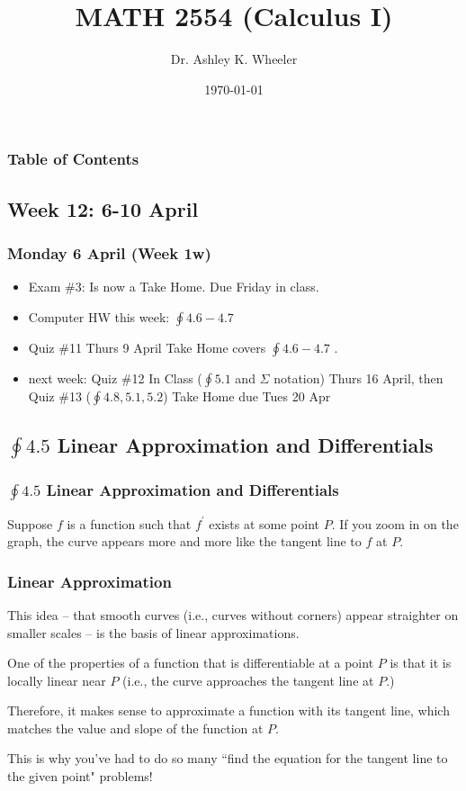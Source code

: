 \documentclass[14pt]{beamer}
\title[Cal I S2015]{MATH 2554 (Calculus I)}
\subtitle{}
\author[Wheeler]{Dr. Ashley K. Wheeler}
\institute{University of Arkansas}
\date{\today}
\begin{document}
\maketitle

\begin{frame}
\frametitle{Table of Contents}
\tableofcontents
\end{frame}


\begin{frame}
\section[Week 12]{Week 12: 6-10 April}
\frametitle{Monday 6 April (Week 1w)}
\small
\begin{itemize}
\item Exam \#3: Is now a Take Home.  Due Friday in class.
\item Computer HW this week: $\oint 4.6-4.7$ 	
\item Quiz \#11 Thurs 9 April Take Home covers $\oint 4.6-4.7$ .
\item next week: Quiz \#12 In Class ($\oint 5.1$ and $\Sigma$ notation) Thurs 16 April, then Quiz \#13 ($\oint 4.8, 5.1, 5.2$) Take Home due Tues 20 Apr
\end{itemize}
\end{frame}

\begin{frame}
\subsection[$\oint 4.5$ Linear Approximation and Differentials]{$\oint 4.5$ Linear Approximation and Differentials}
\frametitle{$\oint 4.5$ Linear Approximation and Differentials}
\footnotesize
Suppose $f$ is a function such that $f^{\prime}$ exists at some point $P$.  If you zoom in on the graph, the curve appears more and more like the tangent line to $f$ at $P$.  

\end{frame}

\begin{frame}
\frametitle{\small Linear Approximation}
\footnotesize
This idea -- that \alert{smooth} curves (i.e., curves without corners) appear straighter on smaller scales -- is the basis of linear approximations.

\vspace{1pc}
One of the properties of a function that is \alert{differentiable} at a point $P$ is that it is \alert{locally linear} near $P$ (i.e., the curve approaches the tangent line at $P$.)

\vspace{1pc}
Therefore, it makes sense to approximate a function with its tangent line, which matches the value and slope of the function at $P$.  

\vspace{1pc}
This is why you've had to do so many ``find the equation for the tangent line to the given point" problems!
\end{frame}
\end{document}
